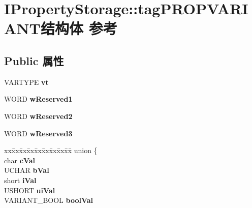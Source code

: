 \hypertarget{struct_i_property_storage_1_1tag_p_r_o_p_v_a_r_i_a_n_t}{}\section{I\+Property\+Storage\+:\+:tag\+P\+R\+O\+P\+V\+A\+R\+I\+A\+N\+T结构体 参考}
\label{struct_i_property_storage_1_1tag_p_r_o_p_v_a_r_i_a_n_t}
\subsection*{Public 属性}
\begin{DoxyCompactItemize}
\item 
\mbox{\label{struct_i_property_storage_1_1tag_p_r_o_p_v_a_r_i_a_n_t_a059d1d176bcc855c21a54f0481d784ab}} 
V\+A\+R\+T\+Y\+PE {\bfseries vt}
\item 
\mbox{\label{struct_i_property_storage_1_1tag_p_r_o_p_v_a_r_i_a_n_t_a6ee6a9cfec9e4c4f84731a2635c94ede}} 
W\+O\+RD {\bfseries w\+Reserved1}
\item 
\mbox{\label{struct_i_property_storage_1_1tag_p_r_o_p_v_a_r_i_a_n_t_a14681ee4e7679325ce7b5236ce4132a4}} 
W\+O\+RD {\bfseries w\+Reserved2}
\item 
\mbox{\label{struct_i_property_storage_1_1tag_p_r_o_p_v_a_r_i_a_n_t_a65e194b525824f215f11e677024e578d}} 
W\+O\+RD {\bfseries w\+Reserved3}
\item 
\mbox{\label{struct_i_property_storage_1_1tag_p_r_o_p_v_a_r_i_a_n_t_ae260dcdd2baad8e89ab04a9b29c6723d}} 
\begin{tabbing}
xx\=xx\=xx\=xx\=xx\=xx\=xx\=xx\=xx\=\kill
union \{\\
\>char {\bfseries cVal}\\
\>UCHAR {\bfseries bVal}\\
\>short {\bfseries iVal}\\
\>USHORT {\bfseries uiVal}\\
\>VARIANT\_BOOL {\bfseries boolVal}\\

\end{tabbing}
\end{DoxyCompactItemize}
